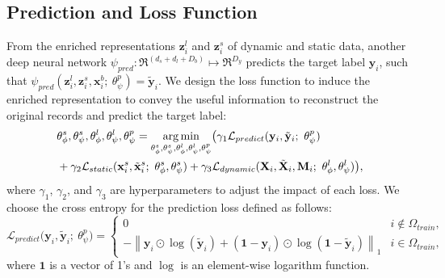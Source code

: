 \subsection{Prediction and Loss Function}
From the enriched representations $\mathbf{z}_i^l$ and $\mathbf{z}_i^s$ of dynamic and static data, another deep neural network $\psi_{pred}: \Re^{(d_s + d_l + D_b)}  \mapsto \Re^{D_y}$ predicts the target label $\mathbf{y}_i$, such that $\psi_{pred}(\mathbf{z}_i^l, \mathbf{z}_i^s, \mathbf{x}_i^b;\ \theta_{\psi}^p) = \tilde{\mathbf{y}}_i$.
We design the loss function to induce the enriched representation to convey the useful information to reconstruct the original records and predict the target label:
\begin{equation}\label{eq: total loss}
\begin{aligned}
    &\theta_{\phi}^s, \theta_{\psi}^s, \theta^l_{\phi}, \theta^l_{\psi}, \theta_{\psi}^p = \argmin_{\theta_{\phi}^s, \theta_{\psi}^s, \theta^l_{\phi}, \theta^l_{\psi}, \theta_{\psi}^p} \bigl(\gamma_1 \mathcal{L}_{predict}(\mathbf{y}_i, \tilde{\mathbf{y}}_i;\ \theta_{\psi}^p) \\
    & + \gamma_2 \mathcal{L}_{static}(\mathbf{x}_i^s, \tilde{\mathbf{x}}_i^s;\ \theta_{\phi}^s, \theta_{\psi}^s) + \gamma_3 \mathcal{L}_{dynamic}(\mathbf{X}_i, \tilde{\mathbf{X}}_i, \mathbf{M}_i;\ \theta^l_{\phi}, \theta^l_{\psi})\bigr),
\end{aligned}
\end{equation}
where $\gamma_1$, $\gamma_2$, and $\gamma_3$ are hyperparameters to adjust the impact of each loss. 
We choose the cross entropy for the prediction loss defined as follows:
\[
\mathcal{L}_{predict}\bigl(\mathbf{y}_i, \tilde{\mathbf{y}}_i;\ \theta_{\psi}^p\bigr)=
\begin{cases}
0 & i \notin \Omega_{train},\\
- \left\|\mathbf{y}_i \odot \operatorname{log}(\tilde{\mathbf{y}}_i) + (\mathbf{1} - \mathbf{y}_i) \odot \operatorname{log}(\mathbf{1} - \tilde{\mathbf{y}}_i)\right\|_1 & i \in \Omega_{train},
\end{cases}
\]
where $\mathbf{1}$ is a vector of 1's and $\operatorname{log}$ is an element-wise logarithm function. 

